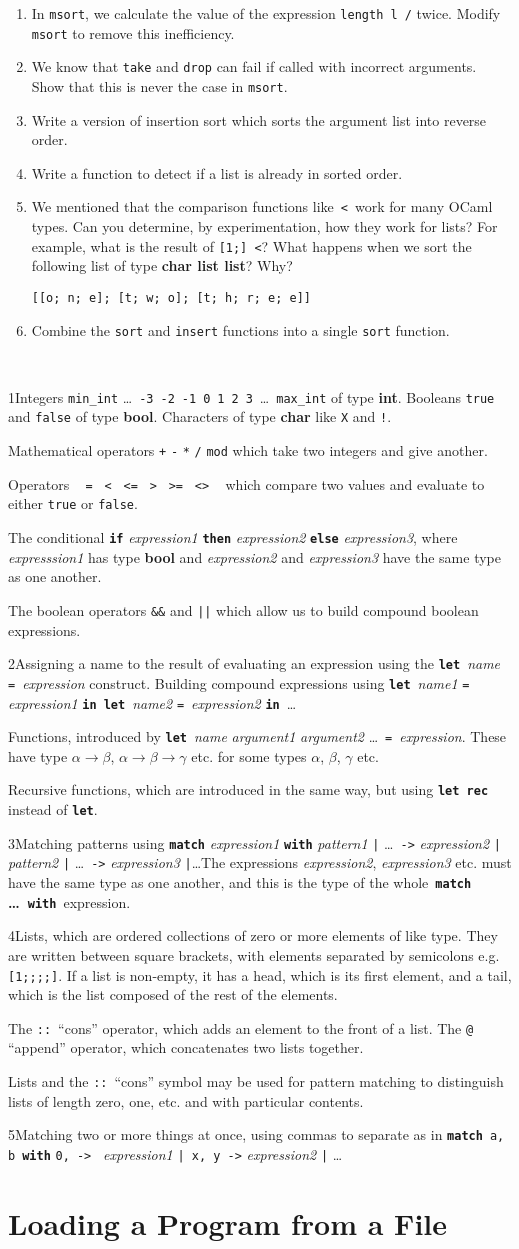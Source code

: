 \documentclass[]{book}
\makeatletter
\newcommand\upquote[1]{\textquotesingle#1\textquotesingle}
\newcommand{\sofarstartingoff}{

\noindent \lettrine[loversize=0.1,nindent=0em]{1}{}Integers \texttt{min\_int} \ldots\ \texttt{-3}\ \texttt{-2}\ \texttt{-1}\ \texttt{0}\ \texttt{1}\ \texttt{2}\ \texttt{3}\ \ldots\ \texttt{max\_int} of type \textbf{\textsf{int}}. Booleans \texttt{true} and \texttt{false} of type \textbf{\textsf{bool}}. \noindent Characters of type \textsf{\textbf{char}} like \texttt{\upquote{X}} and \texttt{\upquote{!}}.
\vspace{2mm}

\noindent Mathematical operators \texttt{+} \texttt{-} \texttt{*} \texttt{/} \texttt{mod} which take two integers and give another.

\vspace{2mm}

\noindent Operators \ \!\! \texttt{=\ \!\!} \texttt{<\ \!\!} \texttt{<=\ \!\!} \texttt{>\ \!\!} \texttt{>=\ \!\!} \texttt{<>} \ \!\! which compare two values and evaluate to either \texttt{true} or \texttt{false}.

\vspace{2mm}

\noindent The conditional \textbf{\texttt{if}} \textit{expression1} \textbf{\texttt{then}} \textit{expression2} \textbf{\texttt{else}} \textit{expression3}, where \textit{expresssion1} has type \textsf{\textbf{bool}} and \textit{expression2} and \textit{expression3} have the same type as one another.

\vspace{2mm}

\noindent The boolean operators \texttt{\&\&} and \texttt{||} which allow us to build compound boolean expressions.}
\newcommand{\sofarfunctions}
{
\noindent\lettrine[loversize=0.1,findent=2pt,nindent=0em]{2}{}Assigning a name to the result of evaluating an expression using the \textbf{\texttt{let}}\ \textit{name} \texttt{=}\ \textit{expression} construct. Building compound expressions using \textbf{\texttt{let}}\ \textit{name1} \texttt{=} \textit{expression1} \textbf{\texttt{in}}\ \textbf{\texttt{let}}\ \textit{name2} \texttt{=}\ \textit{expression2} \textbf{\texttt{in}}\ \ldots

\vspace{2mm} 

\noindent Functions, introduced by \textbf{\texttt{let}}\ \textit{name} \textit{argument1} \textit{argument2} \ldots\ \texttt{=}\ \textit{expression}. These have type $\alpha \rightarrow \beta$, $\alpha \rightarrow \beta \rightarrow \gamma$ etc. for some types $\alpha$, $\beta$, $\gamma$ etc.

\vspace{2mm}

\noindent Recursive functions, which are introduced in the same way, but using \textbf{\texttt{let\!\! rec}} instead of \textbf{\texttt{let}}.}
\newcommand{\sofarcasebycase}
{\noindent \lettrine[loversize=0.1,findent=2pt,nindent=0em]{3}{}Matching patterns using \textbf{\texttt{match}} \textit{expression1} \textbf{\texttt{with}} \textit{pattern1} \texttt{|} \ldots\ \texttt{->} \textit{expression2} \texttt{|} \textit{pattern2} \texttt{|} \ldots\ \texttt{->} \textit{expression3} \texttt{|}\ldots The expressions \textit{expression2}, \textit{expression3} etc. must have the same type as one another, and this is the type of the whole \,\textbf{\texttt{match} \ldots\ \texttt{with}}\, expression.}
\newcommand{\sofarlistingthings}
{
\noindent \lettrine[loversize=0.1,findent=2pt,nindent=0em]{4}{}Lists, which are ordered collections of zero or more elements of like type. They are written between square brackets, with elements separated by semicolons e.g. \texttt{[1;\! 2;\! 3;\! 4;\! 5]}. If a list is non-empty, it has a head, which is its first element, and a tail, which is the list composed of the rest of the elements.

\vspace{2mm}

\noindent The \texttt{::}\ ``cons'' operator, which adds an element to the front of a list. The \texttt{@} ``append'' operator, which concatenates two lists together.

\vspace{2mm}

\noindent Lists and the \texttt{::}\ ``cons'' symbol may be used for pattern matching to distinguish lists of length zero, one, etc. and with particular contents.}
\newcommand{\sofarsortingthings}
{
\noindent \lettrine[loversize=0.1,findent=2pt,nindent=0em]{5}{}Matching two or more things at once, using commas to separate as in \texttt{\textbf{match}}\, \texttt{a,\!\! b}\, \textbf{\texttt{with}} \texttt{0,\!\! 0\! ->\! }\! \textit{expression1} \texttt{|\ \!x,\!\! y\! ->} \textit{expression2} \texttt{|} \ldots
}
\makeatother
\begin{document}
\begin{enumerate}
  \item In \texttt{msort}, we calculate the value of the expression \texttt{length\! l\! /} twice. Modify \texttt{msort} to remove this inefficiency.
  \item We know that \texttt{take} and \texttt{drop} can fail if called with incorrect arguments. Show that this is never the case in \texttt{msort}.
  \item Write a version of insertion sort which sorts the argument list into reverse order.
  \item Write a function to detect if a list is already in sorted order.
  \item We mentioned that the comparison functions like \,\texttt{<}\, work for many OCaml types. Can you determine, by experimentation, how they work for lists? For example, what is the result of \texttt{[1;]\! <\! [2;\! 3]}? What happens when we sort the following list of type \textbf{\textsf{char list list}}? Why?
  
  \vspace{1mm}
  \texttt{\phantom{space}[[\upquote{o}; \upquote{n}; \upquote{e}]; [\upquote{t}; \upquote{w}; \upquote{o}]; [\upquote{t}; \upquote{h}; \upquote{r}; \upquote{e}; \upquote{e}]]}
  
  \item Combine the \texttt{sort} and \texttt{insert} functions into a single \texttt{sort} function.
\end{enumerate}

\cleardoublepage
\thispagestyle{empty}
\\

\begin{multicols*}{2}
\footnotesize
\sofarstartingoff

\vspace{\baselineskip}
\sofarfunctions

\vspace{\baselineskip}
\sofarcasebycase

\vspace{\baselineskip}
\sofarlistingthings

\vspace{\baselineskip}
\sofarsortingthings

\end{multicols*}

\pagestyle{empty}


\chapter*{Loading a Program from a File}
\end{document}
